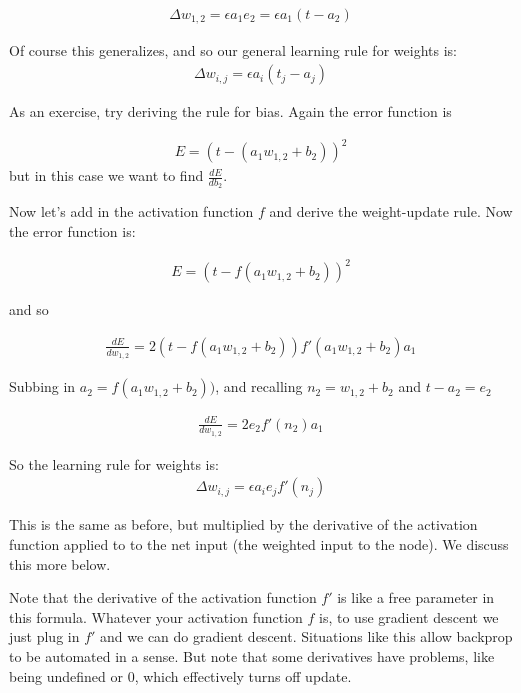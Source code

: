 \begin{eqnarray*}
\Delta w_{1,2}  =  \epsilon a_1 e_2  = \epsilon a_1 (t - a_2)
\end{eqnarray*} 

Of course this generalizes, and so our general learning rule for weights is:
\begin{eqnarray*}
\Delta w_{i,j}  =  \epsilon a_i (t_j - a_j)
\end{eqnarray*} 

As an exercise, try deriving the rule for bias. Again the error function is

\begin{eqnarray*}
E =  (t - ( a_1 w_{1,2} + b_2))^2 
\end{eqnarray*}
but in this case we want to find $\frac{dE}{db_{2}}$.

Now let's add in the activation function $f$ and derive the weight-update rule. Now the error function is:

\begin{eqnarray*}
E =  (t - f(a_1w_{1,2} + b_2))^2   
\end{eqnarray*}

and so

\begin{eqnarray*}
\frac{dE}{dw_{1,2}} = 2 (t - f(a_1w_{1,2} + b_2)) f'(a_1w_{1,2} + b_2) a_1 
\end{eqnarray*}

Subbing in $a_2 = f(a_1w_{1,2} + b_2))$, and recalling $n_2 = w_{1,2} + b_2$  and $t - a_2 = e_2$ 

\begin{eqnarray*}
\frac{dE}{dw_{1,2}}  = 2 e_2 f'(n_2) a_1 
\end{eqnarray*}

So the learning rule for weights is:
\begin{eqnarray*}
\Delta w_{i,j}  =  \epsilon a_i e_j f'(n_j)
\end{eqnarray*} 

This is the same as before, but multiplied by the derivative of the activation function applied to to the net input (the weighted input to the node). We discuss this more below. 

Note that the derivative of the activation function $f'$ is like a free parameter in this formula. Whatever your activation function $f$ is, to use gradient descent we just plug in $f'$ and we can do gradient descent. Situations like this allow backprop to be automated in a sense. But note that some derivatives have problems, like being undefined or 0, which effectively turns off update.

